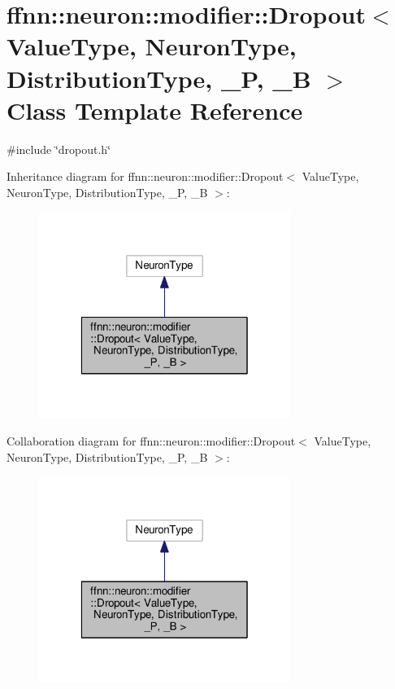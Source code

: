 \hypertarget{classffnn_1_1neuron_1_1modifier_1_1_dropout}{\section{ffnn\-:\-:neuron\-:\-:modifier\-:\-:Dropout$<$ Value\-Type, Neuron\-Type, Distribution\-Type, \-\_\-\-P, \-\_\-\-B $>$ Class Template Reference}
\label{classffnn_1_1neuron_1_1modifier_1_1_dropout}
}


{\ttfamily \#include \char`\"{}dropout.\-h\char`\"{}}



Inheritance diagram for ffnn\-:\-:neuron\-:\-:modifier\-:\-:Dropout$<$ Value\-Type, Neuron\-Type, Distribution\-Type, \-\_\-\-P, \-\_\-\-B $>$\-:
\nopagebreak
\begin{figure}[H]
\begin{center}
\leavevmode
\includegraphics[width=232pt]{classffnn_1_1neuron_1_1modifier_1_1_dropout__inherit__graph}
\end{center}
\end{figure}


Collaboration diagram for ffnn\-:\-:neuron\-:\-:modifier\-:\-:Dropout$<$ Value\-Type, Neuron\-Type, Distribution\-Type, \-\_\-\-P, \-\_\-\-B $>$\-:
\nopagebreak
\begin{figure}[H]
\begin{center}
\leavevmode
\includegraphics[width=232pt]{classffnn_1_1neuron_1_1modifier_1_1_dropout__coll__graph}
\end{center}
\end{figure}
